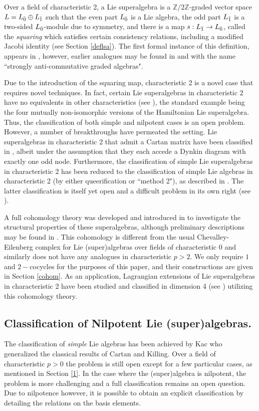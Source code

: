 \documentclass[12pt]{amsart}
\newcommand{\Z}{\mathbb{Z}}
\begin{document}
Over a field of characteristic 2, a Lie superalgebra is a $\Z/2\Z$-graded vector space $L=L_{{\bar0}}\oplus L_{{\bar1}}$ such that the even part $L_{{\bar0}}$ is a Lie algebra, the odd part $L_{{\bar1}}$ is a two-sided  $L_{{\bar0}}$-module due to symmetry, and there is a map $s:L_{{\bar1}}\to L_{{\bar0}}$, called the \textit{squaring} which satisfies certain consistency relations, including a modified Jacobi identity (see Section \ref{deflsa}). The first formal instance of this definition, appears in \cite{LeD}, however, earlier analogues may be found in \cite{BMY} and \cite{NR} with the name ``strongly anti-commutative graded algebras".

Due to the introduction of the squaring map, characteristic 2 is a novel case that requires novel techniques. In fact, certain Lie superalgebras in characteristic 2 have no equivalents in other characteristics (see \cite{BGL1, BGLLS, BLLSq, LeD}), the standard example being the four mutually non-isomorphic versions of the Hamiltonian Lie superalgebra. Thus, the classification of both simple and nilpotent cases is an open problem. However, a number of breakthroughs have permeated the setting. Lie superalgebras in characteristic 2 that admit a Cartan matrix have been classified in \cite{BGL1}, albeit under the assumption that they each accede a Dynkin diagram with exactly one odd node. Furthermore, the classification of simple Lie superalgebras in characteristic 2 has been reduced to the classification of simple Lie algebras in characteristic 2 (by either queerification or ``method 2"), as described in \cite{BLLSq,BGLLS}. The latter classification is itself yet open and a difficult problem in its own right (see \cite{S1,S2}). 

A full cohomology theory was developed and introduced in \cite{BM} to investigate the structural properties of these superalgebras, although preliminary descriptions may be found in \cite{BGLL}. This cohomology is different from the usual Chevalley-Eilenberg complex for Lie (super)algebras over fields of characteristic 0 and similarly does not have any analogues in characteristic $p>2$. We only require $1$ and $2-$cocycles for the purposes of this paper, and their constructions are given in Section \ref{cohom}. As an application, Lagrangian extensions of Lie superalgebras in characteristic 2 have been studied and classified in dimension 4 (see \cite{BBE}) utilizing this cohomology theory.

\subsection{Classification of Nilpotent Lie (super)algebras.} \label{1.2} The classification of \emph{simple} Lie algebras has been achieved by Kac \cite{K} who generalized the classical results of Cartan and Killing. Over a field of characteristic $p>0$ the problem is still open except for a few particular cases, as mentioned in Section \ref{1}. In the case where the (super)algebra is nilpotent, the problem is more challenging and a full classification remains an open question. Due to nilpotence however, it is possible to obtain an explicit classification by detailing the relations on the basis elements.
\end{document}
